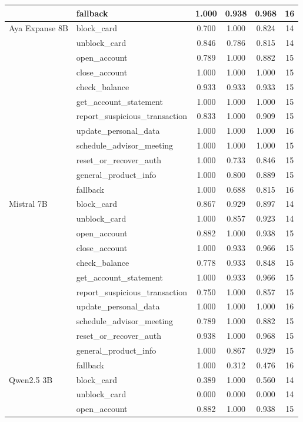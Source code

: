 \begin{table}[H]
\begin{tabular}{llcccc}
 & fallback & 1.000 & 0.938 & 0.968 & 16 \\
\midrule
Aya Expanse 8B & block\_card & 0.700 & 1.000 & 0.824 & 14 \\
 & unblock\_card & 0.846 & 0.786 & 0.815 & 14 \\
 & open\_account & 0.789 & 1.000 & 0.882 & 15 \\
 & close\_account & 1.000 & 1.000 & 1.000 & 15 \\
 & check\_balance & 0.933 & 0.933 & 0.933 & 15 \\
 & get\_account\_statement & 1.000 & 1.000 & 1.000 & 15 \\
 & report\_suspicious\_transaction & 0.833 & 1.000 & 0.909 & 15 \\
 & update\_personal\_data & 1.000 & 1.000 & 1.000 & 16 \\
 & schedule\_advisor\_meeting & 1.000 & 1.000 & 1.000 & 15 \\
 & reset\_or\_recover\_auth & 1.000 & 0.733 & 0.846 & 15 \\
 & general\_product\_info & 1.000 & 0.800 & 0.889 & 15 \\
 & fallback & 1.000 & 0.688 & 0.815 & 16 \\
\midrule
Mistral 7B & block\_card & 0.867 & 0.929 & 0.897 & 14 \\
 & unblock\_card & 1.000 & 0.857 & 0.923 & 14 \\
 & open\_account & 0.882 & 1.000 & 0.938 & 15 \\
 & close\_account & 1.000 & 0.933 & 0.966 & 15 \\
 & check\_balance & 0.778 & 0.933 & 0.848 & 15 \\
 & get\_account\_statement & 1.000 & 0.933 & 0.966 & 15 \\
 & report\_suspicious\_transaction & 0.750 & 1.000 & 0.857 & 15 \\
 & update\_personal\_data & 1.000 & 1.000 & 1.000 & 16 \\
 & schedule\_advisor\_meeting & 0.789 & 1.000 & 0.882 & 15 \\
 & reset\_or\_recover\_auth & 0.938 & 1.000 & 0.968 & 15 \\
 & general\_product\_info & 1.000 & 0.867 & 0.929 & 15 \\
 & fallback & 1.000 & 0.312 & 0.476 & 16 \\
\midrule
Qwen2.5 3B & block\_card & 0.389 & 1.000 & 0.560 & 14 \\
 & unblock\_card & 0.000 & 0.000 & 0.000 & 14 \\
 & open\_account & 0.882 & 1.000 & 0.938 & 15 \\

\end{tabular}
\end{table}
